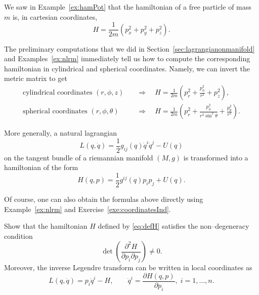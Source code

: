 \documentclass[english,fontsize=11pt,paper=a5,oneside]{scrbook}
\theoremstyle{definition}
\newenvironment{example}
  {\pushQED{\qed}\renewcommand{\qedsymbol}{$\lozenge$}\examplex}
  {\popQED\endexamplex}
\newenvironment{exercise}
  {\pushQED{\qed}\renewcommand{\qedsymbol}{$\maltese$}\exercisex}
  {\popQED\endexercisex}
\begin{document}
\begin{example}
  We saw in Example~\ref{ex:hamPot} that the hamiltonian of a free particle of mass $m$ is, in cartesian coordinates,
  \begin{equation}
    H = \frac{1}{2m}(p_x^2 + p_y^2 + p_z^2).
  \end{equation}

  The preliminary computations that we did in Section~\ref{sec:lagrangianonmanifold} and Examples~\ref{ex:nlrm} immediately tell us how to compute the corresponding hamiltonian in cylindrical and spherical coordinates.
  Namely, we can invert the metric matrix to get
  \begin{align}
    \mbox{cylindrical coordinates } (r,\phi,z) \quad    & \Rightarrow\quad H = \frac 1{2m} \left(p_r^2 + \frac{p_\phi^2}{r^2} + p_z^2\right),                               \\
    \mbox{spherical coordinates } (r,\phi,\theta) \quad & \Rightarrow\quad H = \frac 1{2m} \left(p_r^2 + \frac{p_\phi^2}{r^2\sin^2\theta} + \frac{p_\theta^2}{r^2} \right).
  \end{align}

  More generally, a natural lagrangian
  \begin{equation}
    L(q,\dot q) = \frac 12 g_{ij}(q) \dot q^i \dot q^j - U(q)
  \end{equation}
  on the tangent bundle of a riemannian manifold $(M,g)$ is transformed into a hamiltonian of the form
  \begin{equation}
    H(q,p) = \frac 12 g^{ij}(q) p_i p_j + U(q).
  \end{equation}

  Of course, one can also obtain the formulas above directly using Example~\ref{ex:nlrm} and Exercise~\ref{exe:coordinatesInd}.
\end{example}

\begin{exercise}[Inverse Legendre transform]
  Show that the hamiltonian $H$ defined by \eqref{eq:defH} satisfies the non--degeneracy condition
  \begin{equation}
    \det\left(\frac{\partial^2 H}{\partial p_i\partial p_j}\right) \neq 0.
  \end{equation}
  Moreover, the inverse Legendre transform can be written in local coordinates as
  \begin{equation}\label{eq:inverseLegendre}
    L(q, \dot q) = p_i \dot q^i - H,\qquad
    \dot q^i = \frac{\partial H (q,p)}{\partial p_i}, \; i=1,\ldots,n.
  \end{equation}
\end{exercise}
\end{document}
